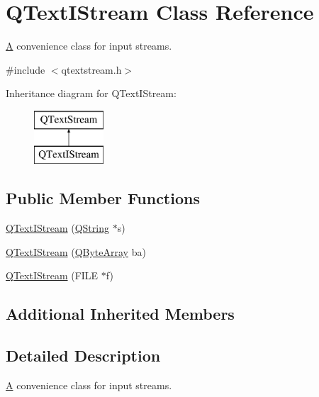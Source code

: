 \hypertarget{class_q_text_i_stream}{}\section{Q\+Text\+I\+Stream Class Reference}
\label{class_q_text_i_stream}


\mbox{\hyperlink{class_a}{A}} convenience class for input streams.  




{\ttfamily \#include $<$qtextstream.\+h$>$}

Inheritance diagram for Q\+Text\+I\+Stream\+:\begin{figure}[H]
\begin{center}
\leavevmode
\includegraphics[height=2.000000cm]{class_q_text_i_stream}
\end{center}
\end{figure}
\subsection*{Public Member Functions}
\begin{DoxyCompactItemize}
\item 
\mbox{\hyperlink{class_q_text_i_stream_ab28dbfb8b102119b18d71bb9676863e4}{Q\+Text\+I\+Stream}} (\mbox{\hyperlink{class_q_string}{Q\+String}} $\ast$s)
\item 
\mbox{\hyperlink{class_q_text_i_stream_a4b612259aaacfd1d63d30f7a1f8f92dc}{Q\+Text\+I\+Stream}} (\mbox{\hyperlink{class_q_array}{Q\+Byte\+Array}} ba)
\item 
\mbox{\hyperlink{class_q_text_i_stream_a1b287a75019206027b1d7fd7f175600e}{Q\+Text\+I\+Stream}} (F\+I\+LE $\ast$f)
\end{DoxyCompactItemize}
\subsection*{Additional Inherited Members}


\subsection{Detailed Description}
\mbox{\hyperlink{class_a}{A}} convenience class for input streams. 

